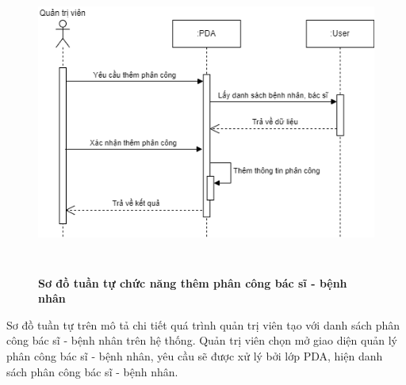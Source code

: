 \begin{figure}[H]
  \centering
  \includegraphics[width=13cm,height=10cm]{Images/sequence/sequence_manage_add_pda.png}
  \caption[Sơ đồ tuần tự chức năng thêm phân công bác sĩ - bệnh nhân]{\bfseries \fontsize{12pt}{0pt}
  \selectfont Sơ đồ tuần tự chức năng thêm phân công bác sĩ - bệnh nhân}
  \label{sequence_manage_add_pda} %
\end{figure}
Sơ đồ tuần tự trên mô tả chi tiết quá trình quản trị viên tạo với danh sách phân công bác sĩ - bệnh nhân trên hệ thống. Quản trị viên chọn mở giao diện
quản lý phân công bác sĩ - bệnh nhân, yêu cầu sẽ được xử lý bởi lớp PDA, hiện danh sách phân công bác sĩ - bệnh nhân. 


